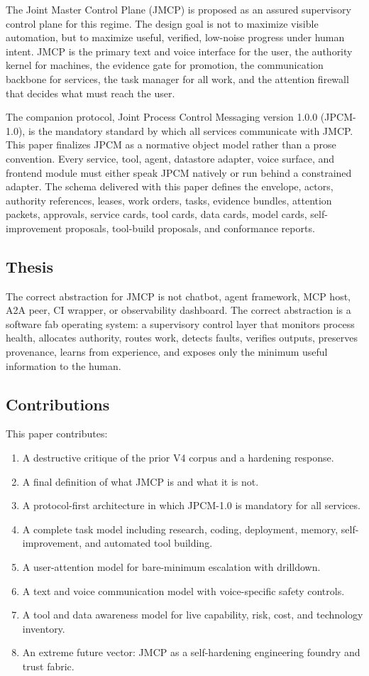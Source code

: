 \documentclass[10pt,journal,onecolumn]{IEEEtran}
\begin{document}
The Joint Master Control Plane (JMCP) is proposed as an assured supervisory control plane for this regime. The design goal is not to maximize visible automation, but to maximize useful, verified, low-noise progress under human intent. JMCP is the primary text and voice interface for the user, the authority kernel for machines, the evidence gate for promotion, the communication backbone for services, the task manager for all work, and the attention firewall that decides what must reach the user.

The companion protocol, Joint Process Control Messaging version 1.0.0 (JPCM-1.0), is the mandatory standard by which all services communicate with JMCP. This paper finalizes JPCM as a normative object model rather than a prose convention. Every service, tool, agent, datastore adapter, voice surface, and frontend module must either speak JPCM natively or run behind a constrained adapter. The schema delivered with this paper defines the envelope, actors, authority references, leases, work orders, tasks, evidence bundles, attention packets, approvals, service cards, tool cards, data cards, model cards, self-improvement proposals, tool-build proposals, and conformance reports.

\subsection{Thesis}
The correct abstraction for JMCP is not chatbot, agent framework, MCP host, A2A peer, CI wrapper, or observability dashboard. The correct abstraction is a software fab operating system: a supervisory control layer that monitors process health, allocates authority, routes work, detects faults, verifies outputs, preserves provenance, learns from experience, and exposes only the minimum useful information to the human.

\subsection{Contributions}
This paper contributes:
\begin{enumerate}
\item A destructive critique of the prior V4 corpus and a hardening response.
\item A final definition of what JMCP is and what it is not.
\item A protocol-first architecture in which JPCM-1.0 is mandatory for all services.
\item A complete task model including research, coding, deployment, memory, self-improvement, and automated tool building.
\item A user-attention model for bare-minimum escalation with drilldown.
\item A text and voice communication model with voice-specific safety controls.
\item A tool and data awareness model for live capability, risk, cost, and technology inventory.
\item An extreme future vector: JMCP as a self-hardening engineering foundry and trust fabric.
\end{enumerate}
\end{document}
